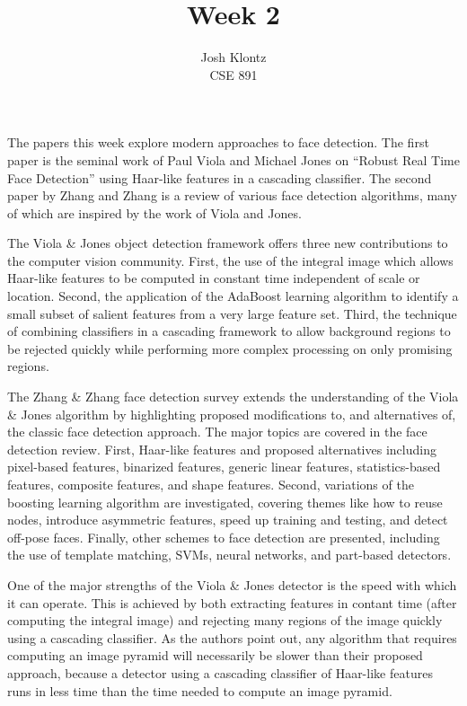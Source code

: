 \documentclass[12pt]{article}
\begin{document}
 
 
\title{Week 2}%
\author{Josh Klontz\\ %
CSE 891} %
 
\maketitle
 
The papers this week explore modern approaches to face detection.
The first paper is the seminal work of Paul Viola and Michael Jones on ``Robust Real Time Face Detection'' using Haar-like features in a cascading classifier.
The second paper by Zhang and Zhang is a review of various face detection algorithms, many of which are inspired by the work of Viola and Jones.
\par
The Viola \& Jones object detection framework offers three new contributions to the computer vision community.
First, the use of the integral image which allows Haar-like features to be computed in constant time independent of scale or location.
Second, the application of the AdaBoost learning algorithm to identify a small subset of salient features from a very large feature set.
Third, the technique of combining classifiers in a cascading framework to allow background regions to be rejected quickly while performing more complex processing on only promising regions.
\par
The Zhang \& Zhang face detection survey extends the understanding of the Viola \& Jones algorithm by highlighting proposed modifications to, and alternatives of, the classic face detection approach.
The major topics are covered in the face detection review.
First, Haar-like features and proposed alternatives including pixel-based features, binarized features, generic linear features, statistics-based features, composite features, and shape features.
Second, variations of the boosting learning algorithm are investigated, covering themes like how to reuse nodes, introduce asymmetric features, speed up training and testing, and detect off-pose faces.
Finally, other schemes to face detection are presented, including the use of template matching, SVMs, neural networks, and part-based detectors.
\par
One of the major strengths of the Viola \& Jones detector is the speed with which it can operate. This is achieved by both extracting features in contant time (after computing the integral image) and rejecting many regions of the image quickly using a cascading classifier. As the authors point out, any algorithm that requires computing an image pyramid will necessarily be slower than their proposed approach, because a detector using a cascading classifier of Haar-like features runs in less time than the time needed to compute an image pyramid.
\end{document}
